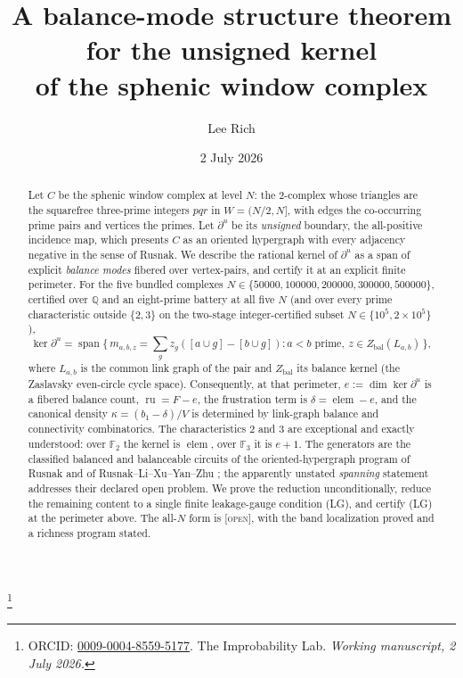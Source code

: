 \documentclass[11pt,reqno]{amsart}
\theoremstyle{plain}
\theoremstyle{definition}
\theoremstyle{plain}
\theoremstyle{definition}
\newcommand{\elem}{\operatorname{elem}}
\newcommand{\ru}{\operatorname{ru}}
\newcommand{\Q}{\mathbb{Q}}
\newcommand{\F}{\mathbb{F}}
\newcommand{\Zbal}{Z_{\mathrm{bal}}}
\newcommand{\dbu}{\partial^{u}}
\newcommand{\dd}{\delta}
\newcommand{\st}{\textsc}
\begin{document}
\title[A balance-mode structure theorem for the unsigned kernel]
{A balance-mode structure theorem for the unsigned kernel\\of the sphenic window complex}
\author{Lee Rich}
\thanks{ORCID: \href{https://orcid.org/0009-0004-8559-5177}{0009-0004-8559-5177}.
The Improbability Lab. \emph{Working manuscript, 2 July 2026.}}
\date{2 July 2026}

\begin{abstract}
Let $C$ be the sphenic window complex at level $N$: the $2$-complex whose triangles are the
squarefree three-prime integers $pqr$ in $W=(N/2,N]$, with edges the co-occurring prime pairs
and vertices the primes. Let $\dbu$ be its \emph{unsigned} boundary, the all-positive incidence
map, which presents $C$ as an oriented hypergraph with every adjacency negative in the sense of
Rusnak. We describe the rational kernel of $\dbu$ as a span of explicit \emph{balance modes}
fibered over vertex-pairs, and certify it at an explicit finite perimeter. For the five bundled
complexes $N\in\{50000,100000,200000,300000,500000\}$, certified over $\Q$ and an eight-prime
battery at all five $N$ (and over every prime characteristic outside $\{2,3\}$ on the two-stage
integer-certified subset $N\in\{10^5,2\times10^5\}$),
\[
\ker\dbu=\operatorname{span}\bigl\{\,m_{a,b,z}=\textstyle\sum_g z_g([a\cup g]-[b\cup g]):
a<b\text{ prime},\ z\in\Zbal(L_{a,b})\,\bigr\},
\]
where $L_{a,b}$ is the common link graph of the pair and $\Zbal$ its balance kernel (the
Zaslavsky even-circle cycle space). Consequently, at that perimeter, $e:=\dim\ker\dbu$ is a
fibered balance count, $\ru=F-e$, the frustration term is $\dd=\elem-e$, and the canonical
density $\kappa=(b_1-\dd)/V$ is determined by link-graph balance and connectivity combinatorics.
The characteristics $2$ and $3$ are exceptional and exactly understood: over $\F_2$ the kernel
is $\elem$, over $\F_3$ it is $e+1$. The generators are the classified balanced and balanceable
circuits of the oriented-hypergraph program of Rusnak \cite{Rusnak2013} and of
Rusnak--Li--Xu--Yan--Zhu \cite{RLXYZ2022}; the apparently unstated \emph{spanning} statement
addresses their declared open problem. We prove the reduction unconditionally, reduce the
remaining content to a single finite leakage-gauge condition (LG), and certify (LG) at the
perimeter above. The all-$N$ form is \st{[open]}, with the band localization proved and a
richness program stated.
\end{abstract}

\maketitle
\end{document}
